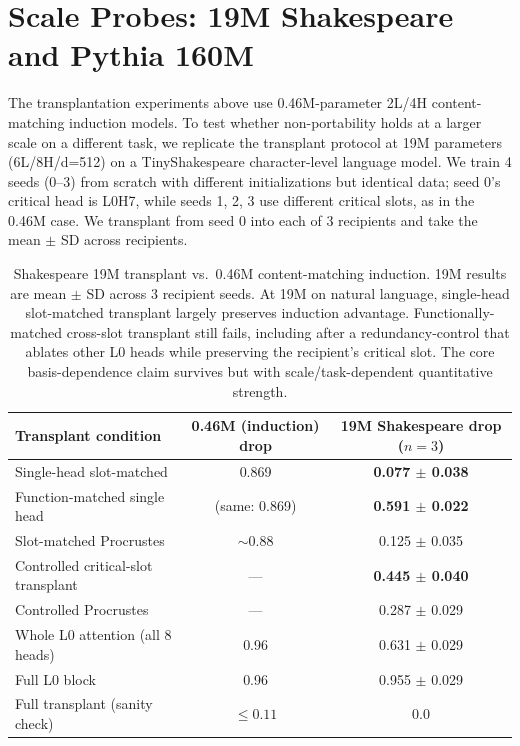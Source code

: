 \documentclass[final]{article}
\begin{document}
\section{Scale Probes: 19M Shakespeare and Pythia 160M}
\label{sec:scale}

The transplantation experiments above use 0.46M-parameter 2L/4H content-matching
induction models. To test whether non-portability holds at a larger scale on a
different task, we replicate the transplant protocol at 19M parameters
(6L/8H/d=512) on a TinyShakespeare character-level language model. We train
4 seeds (0--3) from scratch with different initializations but identical data;
seed 0's critical head is L0H7, while seeds 1, 2, 3 use different critical
slots, as in the 0.46M case. We transplant from seed 0 into each of 3
recipients and take the mean $\pm$ SD across recipients.

\begin{table}[h]
\centering
\small
\caption{Shakespeare 19M transplant vs.\ 0.46M content-matching induction. 19M
results are mean $\pm$ SD across 3 recipient seeds. At 19M on natural
language, single-head slot-matched transplant largely preserves induction
advantage. Functionally-matched cross-slot transplant still fails, including
after a redundancy-control that ablates other L0 heads while preserving the
recipient's critical slot. The core basis-dependence claim survives but with
scale/task-dependent quantitative strength.}
\label{tab:scale_replication}
\begin{tabular}{lcc}
\toprule
Transplant condition & 0.46M (induction) drop & 19M Shakespeare drop ($n=3$) \\
\midrule
Single-head slot-matched & 0.869 & \textbf{0.077 $\pm$ 0.038} \\
Function-matched single head & (same: 0.869) & \textbf{0.591 $\pm$ 0.022} \\
Slot-matched Procrustes & $\sim$0.88 & 0.125 $\pm$ 0.035 \\
Controlled critical-slot transplant & --- & \textbf{0.445 $\pm$ 0.040} \\
Controlled Procrustes & --- & 0.287 $\pm$ 0.029 \\
Whole L0 attention (all 8 heads) & 0.96 & 0.631 $\pm$ 0.029 \\
Full L0 block & 0.96 & 0.955 $\pm$ 0.029 \\
Full transplant (sanity check) & $\leq 0.11$ & 0.0 \\
\bottomrule
\end{tabular}
\end{table}
\end{document}
